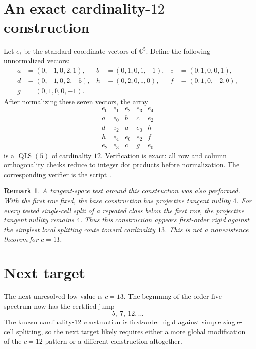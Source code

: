 \documentclass[11pt]{article}
\newtheorem{remark}{Remark}
\newcommand{\C}{\mathbb{C}}
\newcommand{\QLS}{\operatorname{QLS}}
\begin{document}
\section{An exact cardinality-\texorpdfstring{\(12\)}{12} construction}
\label{sec:c12}

Let \(e_i\) be the standard coordinate vectors of \(\C^5\).  Define the
following unnormalized vectors:
\[
\begin{aligned}
a&=(0,-1,0, 2, 1),&
b&=(0, 1,0, 1,-1),&
c&=(0, 1,0, 0, 1),\\
d&=(0,-1,0, 2,-5),&
h&=(0, 2,0, 1, 0),&
f&=(0, 1,0,-2, 0),\\
g&=(0, 1,0, 0,-1).
\end{aligned}
\]
After normalizing these seven vectors, the array
\[
\begin{array}{ccccc}
e_0 & e_1 & e_2 & e_3 & e_4\\
a   & e_0 & b   & c   & e_2\\
d   & e_2 & a   & e_0 & h\\
h   & e_4 & e_0 & e_2 & f\\
e_2 & e_3 & c   & g   & e_0
\end{array}
\]
is a \(\QLS(5)\) of cardinality \(12\).  Verification is exact: all row and
column orthogonality checks reduce to integer dot products before
normalization.  The corresponding verifier is the script
.

\begin{remark}
A tangent-space test around this construction was also performed.  With the
first row fixed, the base construction has projective tangent nullity \(4\).
For every tested single-cell split of a repeated class below the first row,
the projective tangent nullity remains \(4\).  Thus this construction appears
first-order rigid against the simplest local splitting route toward
cardinality \(13\).  This is not a nonexistence theorem for \(c=13\).
\end{remark}

\section{Next target}

The next unresolved low value is \(c=13\).  The beginning of the order-five
spectrum now has the certified jump
\[
  5,\ 7,\ 12,\ldots
\]
The known cardinality-\(12\) construction is first-order rigid against simple
single-cell splitting, so the next target likely requires either a more global
modification of the \(c=12\) pattern or a different construction altogether.
\end{document}
